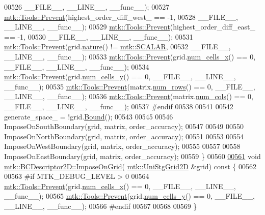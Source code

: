 \begin{DoxyCode}
00526                       \_\_FILE\_\_, \_\_LINE\_\_, \_\_func\_\_);
00527   \hyperlink{classmtk_1_1Tools_a332324c6f25e66be9dff48c5987a3b9f}{mtk::Tools::Prevent}(highest\_order\_diff\_west\_ == -1,
00528                       \_\_FILE\_\_, \_\_LINE\_\_, \_\_func\_\_);
00529   \hyperlink{classmtk_1_1Tools_a332324c6f25e66be9dff48c5987a3b9f}{mtk::Tools::Prevent}(highest\_order\_diff\_east\_ == -1,
00530                       \_\_FILE\_\_, \_\_LINE\_\_, \_\_func\_\_);
00531   \hyperlink{classmtk_1_1Tools_a332324c6f25e66be9dff48c5987a3b9f}{mtk::Tools::Prevent}(grid.\hyperlink{classmtk_1_1UniStgGrid2D_a99a3a9cdb05b7306be99bde935509e30}{nature}() != \hyperlink{namespacemtk_ga4c54f2a329cfb4e56213b02a259d19e2af481d45bd70d41381c7d72e200889205}{mtk::SCALAR},
00532                       \_\_FILE\_\_, \_\_LINE\_\_, \_\_func\_\_);
00533   \hyperlink{classmtk_1_1Tools_a332324c6f25e66be9dff48c5987a3b9f}{mtk::Tools::Prevent}(grid.\hyperlink{classmtk_1_1UniStgGrid2D_a2d182866a398aba8e4829590e85bf939}{num\_cells\_x}() == 0, \_\_FILE\_\_, \_\_LINE\_\_, \_\_func\_\_);
00534   \hyperlink{classmtk_1_1Tools_a332324c6f25e66be9dff48c5987a3b9f}{mtk::Tools::Prevent}(grid.\hyperlink{classmtk_1_1UniStgGrid2D_aed05a801cc9a76dba0ff203cea58a61a}{num\_cells\_y}() == 0, \_\_FILE\_\_, \_\_LINE\_\_, \_\_func\_\_);
00535   \hyperlink{classmtk_1_1Tools_a332324c6f25e66be9dff48c5987a3b9f}{mtk::Tools::Prevent}(matrix.\hyperlink{classmtk_1_1DenseMatrix_a53f3afb3b6a8d21854458aaa9663cc74}{num\_rows}() == 0, \_\_FILE\_\_, \_\_LINE\_\_, \_\_func\_\_);
00536   \hyperlink{classmtk_1_1Tools_a332324c6f25e66be9dff48c5987a3b9f}{mtk::Tools::Prevent}(matrix.\hyperlink{classmtk_1_1DenseMatrix_a41747502d468c6728a4be31501b16e0e}{num\_cols}() == 0, \_\_FILE\_\_, \_\_LINE\_\_, \_\_func\_\_);
00537 \textcolor{preprocessor}{  #endif}
00538 
00541 
00542   generate\_space\_ = !grid.\hyperlink{classmtk_1_1UniStgGrid2D_aa651194ccd0321a7c61a8f56fa5e8455}{Bound}();
00543 
00545 
00546   ImposeOnSouthBoundary(grid, matrix, order\_accuracy);
00547 
00549 
00550   ImposeOnNorthBoundary(grid, matrix, order\_accuracy);
00551 
00553 
00554   ImposeOnWestBoundary(grid, matrix, order\_accuracy);
00555 
00557 
00558   ImposeOnEastBoundary(grid, matrix, order\_accuracy);
00559 \}
00560 
\hypertarget{mtk__bc__descriptor__2d_8cc_source_l00561}{}\hyperlink{classmtk_1_1BCDescriptor2D_a5f0ff1fda1b5266dcd77ba2301c8ba2c}{00561} \textcolor{keywordtype}{void} \hyperlink{classmtk_1_1BCDescriptor2D_a5f0ff1fda1b5266dcd77ba2301c8ba2c}{mtk::BCDescriptor2D::ImposeOnGrid}(
      \hyperlink{classmtk_1_1UniStgGrid2D}{mtk::UniStgGrid2D} &grid)\textcolor{keyword}{ const }\{
00562 
00563 \textcolor{preprocessor}{  #if MTK\_DEBUG\_LEVEL > 0}
00564   \hyperlink{classmtk_1_1Tools_a332324c6f25e66be9dff48c5987a3b9f}{mtk::Tools::Prevent}(grid.\hyperlink{classmtk_1_1UniStgGrid2D_a2d182866a398aba8e4829590e85bf939}{num\_cells\_x}() == 0, \_\_FILE\_\_, \_\_LINE\_\_, \_\_func\_\_);
00565   \hyperlink{classmtk_1_1Tools_a332324c6f25e66be9dff48c5987a3b9f}{mtk::Tools::Prevent}(grid.\hyperlink{classmtk_1_1UniStgGrid2D_aed05a801cc9a76dba0ff203cea58a61a}{num\_cells\_y}() == 0, \_\_FILE\_\_, \_\_LINE\_\_, \_\_func\_\_);
00566 \textcolor{preprocessor}{  #endif}
00567 
00568 
00569 \}
\end{DoxyCode}
